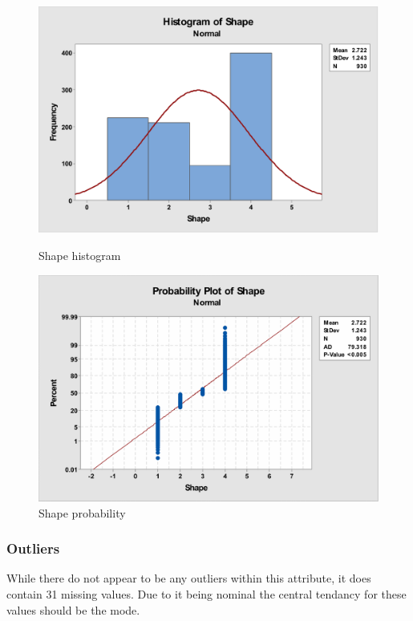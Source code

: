 \documentclass[12pt]{article}
\begin{document}
        \begin{figure}[H]
          \centering
          \begin{minipage}[b]{0.45\textwidth}
            \includegraphics[width=\textwidth]{shape-histogram}
            \caption{Shape histogram}
            \label{fig:shape-histogram}
          \end{minipage}
          \hfill
          \begin{minipage}[b]{0.45\textwidth}
            \includegraphics[width=\textwidth]{shape-probability}
            \caption{Shape probability}
            \label{fig:shape-probability}
          \end{minipage}
        \end{figure}

      \subsubsection{Outliers}
        While there do not appear to be any outliers within this attribute, it does contain 31 missing values. Due to it being nominal the central tendancy for these values should be the mode.
\end{document}
